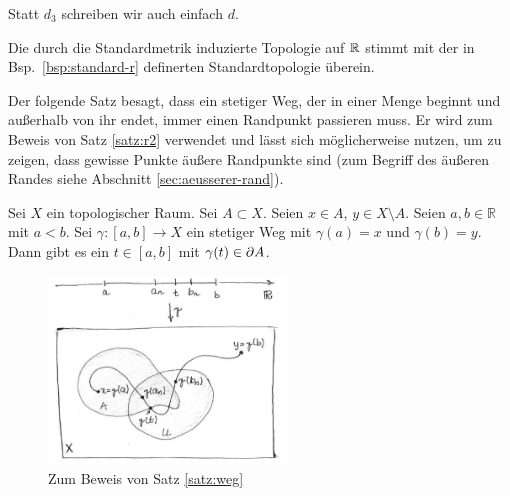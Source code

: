     \begin{konv}\label{konv:d3}
        Statt $d_3$ schreiben wir auch einfach $d$.	
    \end{konv}
    
    \begin{bem}
        Die durch die Standardmetrik induzierte Topologie auf $\mathbb{R}$ stimmt mit der in Bsp.~\ref{bsp:standard-r} definerten Standardtopologie überein.
    \end{bem}


    Der folgende Satz besagt, dass ein stetiger Weg, der in einer Menge beginnt und außerhalb von ihr endet, immer einen Randpunkt passieren muss. Er wird zum Beweis von Satz \ref{satz:r2} verwendet und lässt sich möglicherweise nutzen, um zu zeigen, dass gewisse Punkte äußere Randpunkte sind (zum Begriff des äußeren Randes siehe Abschnitt \ref{sec:aeusserer-rand}).
    \begin{satz}\label{satz:weg} %
        Sei $X$ ein topologischer Raum. Sei $A \subset X$. Seien $x \in A$, $y \in X \setminus A$. Seien $a,b \in \mathbb{R}$ mit $a < b$. Sei $\gamma : [a,b] \to X$ ein stetiger Weg mit $\gamma(a) = x$ und $\gamma(b) = y$. Dann gibt es ein $t \in [a,b]$ mit $\gamma(t) \in \partial A$.
    \end{satz}
    
    \begin{figure}[ht]
        \centering
        \includegraphics[height=5cm]{gfx/weg_sw.png}
        \caption{Zum Beweis von Satz \ref{satz:weg}}
        \label{fig:weg}
    \end{figure}

